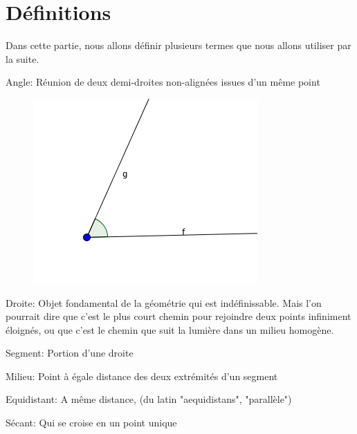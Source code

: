 
%

%

\section{Définitions}
Dans cette partie, nous allons définir plusieurs termes que nous allons utiliser par la suite.\\

\begin{definition}{Angle:}
Réunion de deux demi-droites non-alignées issues d'un même point
\begin{figure}[H]
    \centering
    \includegraphics[scale=0.4]{definitions/angle.png}
\end{figure}
\end{definition}
\begin{definition}{Droite:}
Objet fondamental de la géométrie qui est indéfinissable. Mais l'on pourrait dire que c'est le plus court chemin pour rejoindre deux points infiniment éloignés, ou que c'est le chemin que suit la lumière dans un milieu homogène.
\end{definition}
\begin{definition}{Segment:}
Portion d'une droite
\end{definition}
\begin{definition}{Milieu:}
Point à égale distance des deux extrémités d'un segment
\end{definition}
\begin{definition}{Equidistant:}
A même distance, (du latin "aequidistans", "parallèle")
\end{definition}
\begin{definition}{Sécant:}
Qui se croise en un point unique
\end{definition}
